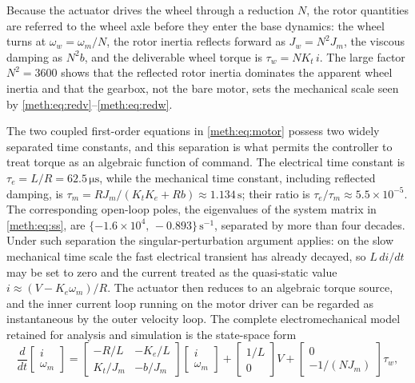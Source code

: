 Because the actuator drives the wheel through a reduction $N$, the rotor quantities are referred to the wheel axle before they enter the base dynamics: the wheel turns at $\omega_w=\omega_m/N$, the rotor inertia reflects forward as $J_w=N^{2}J_m$, the viscous damping as $N^{2}b$, and the deliverable wheel torque is $\tau_w=N K_t\,i$. The large factor $N^2=3600$ shows that the reflected rotor inertia dominates the apparent wheel inertia and that the gearbox, not the bare motor, sets the mechanical scale seen by \eqref{meth:eq:redv}--\eqref{meth:eq:redw}.

The two coupled first-order equations in \eqref{meth:eq:motor} possess two widely separated time constants, and this separation is what permits the controller to treat torque as an algebraic function of command. The electrical time constant is $\tau_e=L/R=\ensuremath{62.5\,\mathrm{\mu s}}$, while the mechanical time constant, including reflected damping, is $\tau_m=R J_m/(K_tK_e+Rb)\approx\ensuremath{1.134\,\mathrm{s}}$; their ratio is $\tau_e/\tau_m\approx 5.5\times10^{-5}$. The corresponding open-loop poles, the eigenvalues of the system matrix in \eqref{meth:eq:ss}, are $\{-1.6\times10^{4},\,-0.893\}\,\ensuremath{\mathrm{s^{-1}}}$, separated by more than four decades. Under such separation the singular-perturbation argument applies: on the slow mechanical time scale the fast electrical transient has already decayed, so $L\,di/dt$ may be set to zero and the current treated as the quasi-static value $i\approx(V-K_e\omega_m)/R$. The actuator then reduces to an algebraic torque source, and the inner current loop running on the motor driver can be regarded as instantaneous by the outer velocity loop. The complete electromechanical model retained for analysis and simulation is the state-space form
\begin{equation}\label{meth:eq:ss}
\frac{d}{dt}\begin{bmatrix}i\\[2pt]\omega_m\end{bmatrix}
=
\begin{bmatrix}
-R/L & -K_e/L\\[2pt]
K_t/J_m & -b/J_m
\end{bmatrix}
\begin{bmatrix}i\\[2pt]\omega_m\end{bmatrix}
+
\begin{bmatrix}1/L\\[2pt]0\end{bmatrix}V
+
\begin{bmatrix}0\\[2pt]-1/(N J_m)\end{bmatrix}\tau_w,
\end{equation}
